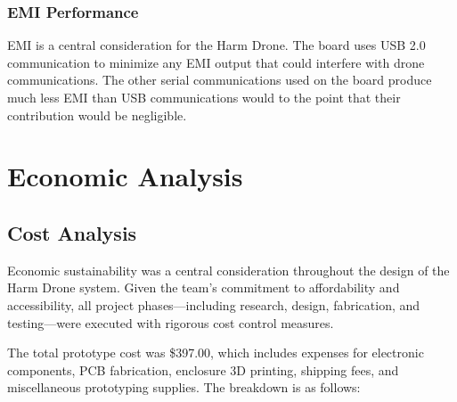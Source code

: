 \documentclass[12pt]{article}
\begin{document}
\subsubsection{EMI Performance}
EMI is a central consideration for the Harm Drone. The board uses USB 2.0 communication to minimize any EMI output that could interfere with drone communications. The other serial communications used on the board produce much less EMI than USB communications would to the point that their contribution would be negligible.

\section{Economic Analysis}

\subsection{Cost Analysis}

\par Economic sustainability was a central consideration throughout the design of the Harm Drone system. Given the team's commitment to affordability and accessibility, all project phases—including research, design, fabrication, and testing—were executed with rigorous cost control measures.

\par The total prototype cost was \$397.00, which includes expenses for electronic components, PCB fabrication, enclosure 3D printing, shipping fees, and miscellaneous prototyping supplies. The breakdown is as follows:
\end{document}

